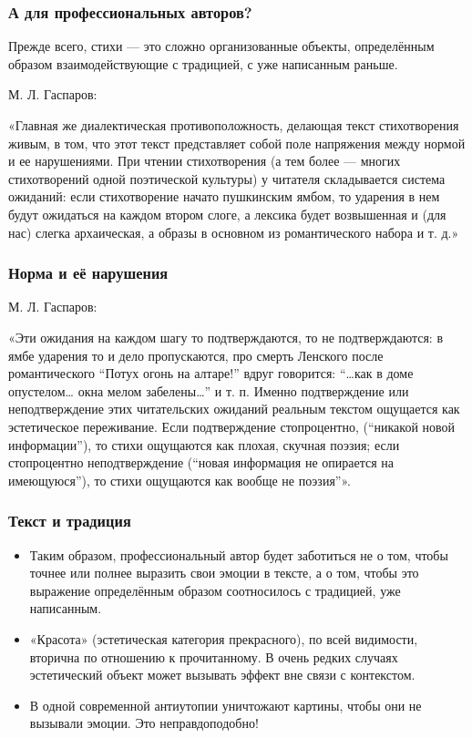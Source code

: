 \documentclass{beamer}
\begin{document}
\begin{frame}
\frametitle{А для профессиональных авторов?}
\begin{flushleft}
Прежде всего, стихи — это сложно организованные объекты, определённым образом взаимодействующие с традицией, с уже написанным раньше.
\end{flushleft}


М. Л. Гаспаров:

«Главная же диалектическая противоположность, делающая текст стихотворения живым, в том, что этот текст представляет собой поле напряжения между нормой и ее нарушениями. При чтении стихотворения (а тем более — многих стихотворений одной поэтической культуры) у читателя складывается система ожиданий: если стихотворение начато пушкинским ямбом, то ударения в нем будут ожидаться на каждом втором слоге, а лексика будет возвышенная и (для нас) слегка архаическая, а образы в основном из романтического набора и т. д.»
\end{frame}


\begin{frame}
\frametitle{Норма и её нарушения}
М. Л. Гаспаров:

«Эти ожидания на каждом шагу то подтверждаются, то не подтверждаются: в ямбе ударения то и дело пропускаются, про смерть Ленского после романтического “Потух огонь на алтаре!” вдруг говорится: “…как в доме опустелом… окна мелом забелены…” и т. п. Именно подтверждение или неподтверждение этих читательских ожиданий реальным текстом ощущается как эстетическое переживание. Если подтверждение стопроцентно, (“никакой новой информации”), то стихи ощущаются как плохая, скучная поэзия; если стопроцентно неподтверждение (“новая информация не опирается на имеющуюся”), то стихи ощущаются как вообще не поэзия”». 
\end{frame}


\begin{frame}
\frametitle{Текст и традиция}
\begin{itemize}
\item Таким образом, профессиональный автор будет заботиться не о том, чтобы точнее или полнее выразить свои эмоции в тексте, а о том, чтобы это выражение определённым образом соотносилось с традицией, уже написанным. 

\item «Красота» (эстетическая категория прекрасного), по всей видимости, вторична по отношению к прочитанному. В очень редких случаях эстетический объект может вызывать эффект вне связи с контекстом.

\item В одной современной антиутопии уничтожают картины, чтобы они не вызывали эмоции. Это неправдоподобно!

\end{itemize}

\end{frame}
\end{document}
